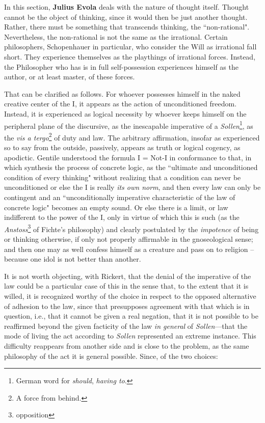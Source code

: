 \begin{quotex}
In this section, \textbf{Julius Evola} deals with the nature of thought itself. Thought cannot be the object of thinking, since it would then be just another thought. Rather, there must be something that transcends thinking, the ``non-rational". Nevertheless, the non-rational is not the same as the irrational. Certain philosophers, Schopenhauer in particular, who consider the Will as irrational fall short. They experience themselves as the playthings of irrational forces. Instead, the Philosopher who has is in full self-possession experiences himself as the author, or at least master, of these forces.

\end{quotex}
That can be clarified as follows. For whoever possesses himself in the naked creative center of the I, it appears as the action of unconditioned freedom. Instead, it is experienced as logical necessity by whoever keeps himself on the peripheral plane of the discursive, as the inescapable imperative of a \emph{Sollen}\footnote{German word for \textit{should}, \textit{having to}.}, as the \emph{vis a tergo}\footnote{A force from behind.} of duty and law. The arbitrary affirmation, insofar as experienced so to say from the outside, passively, appears as truth or logical cogency, as apodictic. Gentile understood the formula I = Not-I in conformance to that, in which synthesis the process of concrete logic, as the ``ultimate and unconditioned condition of every thinking" without realizing that a condition can never be unconditioned or else the I is really \emph{its own norm}, and then every law can only be contingent and an ``unconditionally imperative characteristic of the law of concrete logic" becomes an empty sound. Or else there is a limit, or law indifferent to the power of the I, only in virtue of which this is such (as the \emph{Anstoss}\footnote{opposition} of Fichte's philosophy) and clearly postulated by the \emph{impotence} of being or thinking otherwise, if only not properly affirmable in the gnoseological sense; and then one may as well confess himself as a creature and pass on to religion – because one idol is not better than another.

It is not worth objecting, with Rickert, that the denial of the imperative of the law could be a particular case of this in the sense that, to the extent that it is willed, it is recognized worthy of the choice in respect to the opposed alternative of adhesion to the law, since that presupposes agreement with that which is in question, i.e., that it cannot be given a real negation, that it is not possible to be reaffirmed beyond the given facticity of the law \emph{in general} of \emph{Sollen}—that the mode of living the act according to \emph{Sollen} represented an extreme instance. This difficulty reappears from another side and is close to the problem, as the same philosophy of the act it is general possible. Since, of the two choices:


